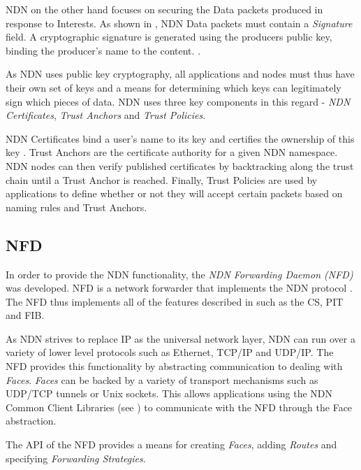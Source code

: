 NDN on the other hand focuses on securing the Data packets produced in response to Interests. As shown in , NDN Data packets must contain a \textit{Signature} field. A cryptographic signature is generated using the producers public key, binding the producer's name to the content. \cite{ndn-security-overview}.

As NDN uses public key cryptography, all applications and nodes must thus have their own set of keys and a means for determining which keys can legitimately sign which pieces of data. NDN uses three key components in this regard - \textit{NDN Certificates}, \textit{Trust Anchors} and \textit{Trust Policies}.

NDN Certificates bind a user's name to its key and certifies the ownership of this key \cite{ndn-security-overview}. Trust Anchors are the certificate authority for a given NDN namespace. NDN nodes can then verify published certificates by backtracking along the trust chain until a Trust Anchor is reached. Finally, Trust Policies are used by applications to define whether or not they will accept certain packets based on naming rules and Trust Anchors.










\subsection{NFD}
In order to provide the NDN functionality, the \textit{NDN Forwarding Daemon (NFD)} was developed. NFD is a network forwarder that implements the NDN protocol \cite{nfd-github}. The NFD thus implements all of the features described in  such as the CS, PIT and FIB. 

 As NDN strives to replace IP as the universal network layer, NDN can run over a variety of lower level protocols such as Ethernet, TCP/IP and UDP/IP. The NFD provides this functionality by abstracting communication to dealing with \textit{Faces}. \textit{Faces} can be backed by a variety of transport mechanisms such as UDP/TCP tunnels or Unix sockets. This allows applications using the NDN Common Client Libraries (see ) to communicate with the NFD through the Face abstraction.

 The API of the NFD provides a means for creating \textit{Faces}, adding \textit{Routes} and specifying \textit{Forwarding Strategies}.
 
